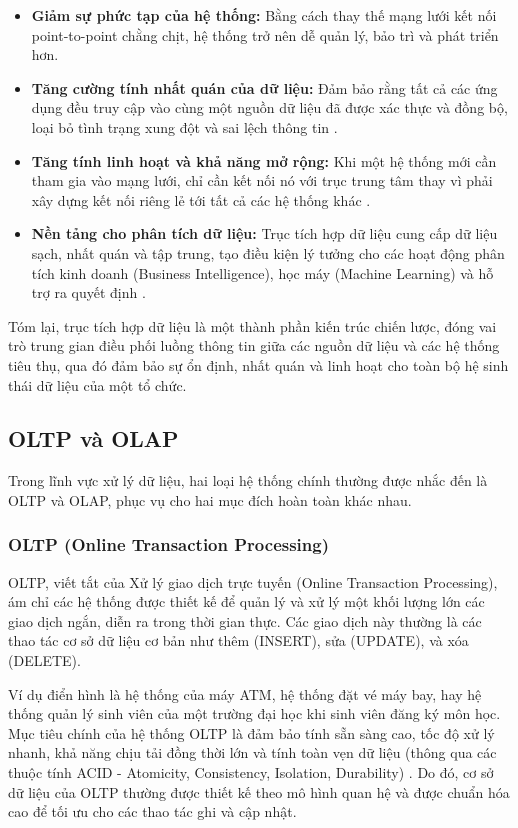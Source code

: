 \begin{itemize}
    \item \textbf{Giảm sự phức tạp của hệ thống:} Bằng cách thay thế mạng lưới kết nối point-to-point chằng chịt, hệ thống trở nên dễ quản lý, bảo trì và phát triển hơn.
    \item \textbf{Tăng cường tính nhất quán của dữ liệu:} Đảm bảo rằng tất cả các ứng dụng đều truy cập vào cùng một nguồn dữ liệu đã được xác thực và đồng bộ, loại bỏ tình trạng xung đột và sai lệch thông tin \cite{microsoft:pubsub, gartner:data_consistency}.
    \item \textbf{Tăng tính linh hoạt và khả năng mở rộng:} Khi một hệ thống mới cần tham gia vào mạng lưới, chỉ cần kết nối nó với trục trung tâm thay vì phải xây dựng kết nối riêng lẻ tới tất cả các hệ thống khác \cite{confluent:pubsub}.
    \item \textbf{Nền tảng cho phân tích dữ liệu:} Trục tích hợp dữ liệu cung cấp dữ liệu sạch, nhất quán và tập trung, tạo điều kiện lý tưởng cho các hoạt động phân tích kinh doanh (Business Intelligence), học máy (Machine Learning) và hỗ trợ ra quyết định \cite{informatica:whatisdih,ibm:bi_from_di}.
\end{itemize}

Tóm lại, trục tích hợp dữ liệu là một thành phần kiến trúc chiến lược, đóng vai trò trung gian điều phối luồng thông tin giữa các nguồn dữ liệu và các hệ thống tiêu thụ, qua đó đảm bảo sự ổn định, nhất quán và linh hoạt cho toàn bộ hệ sinh thái dữ liệu của một tổ chức.

\subsection{OLTP và OLAP}
Trong lĩnh vực xử lý dữ liệu, hai loại hệ thống chính thường được nhắc đến là OLTP và OLAP, phục vụ cho hai mục đích hoàn toàn khác nhau.

\subsubsection{OLTP (Online Transaction Processing)}
OLTP, viết tắt của Xử lý giao dịch trực tuyến (Online Transaction Processing), ám chỉ các hệ thống được thiết kế để quản lý và xử lý một khối lượng lớn các giao dịch ngắn, diễn ra trong thời gian thực. Các giao dịch này thường là các thao tác cơ sở dữ liệu cơ bản như thêm (INSERT), sửa (UPDATE), và xóa (DELETE).

Ví dụ điển hình là hệ thống của máy ATM, hệ thống đặt vé máy bay, hay hệ thống quản lý sinh viên của một trường đại học khi sinh viên đăng ký môn học. Mục tiêu chính của hệ thống OLTP là đảm bảo tính sẵn sàng cao, tốc độ xử lý nhanh, khả năng chịu tải đồng thời lớn và tính toàn vẹn dữ liệu (thông qua các thuộc tính ACID - Atomicity, Consistency, Isolation, Durability) \cite{microsoft:oltp}. Do đó, cơ sở dữ liệu của OLTP thường được thiết kế theo mô hình quan hệ và được chuẩn hóa cao để tối ưu cho các thao tác ghi và cập nhật.

